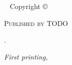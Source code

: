 \newpage
\begin{fullwidth}
~\vfill
\thispagestyle{empty}
\setlength{\parindent}{0pt}
\setlength{\parskip}{\baselineskip}
Copyright \copyright\ \the\year\ \thanklessauthor

\par\textsc{Published by TODO}

\par\bookurl

\par \TODO.

\par\textit{First printing, \monthyear}
\end{fullwidth}
